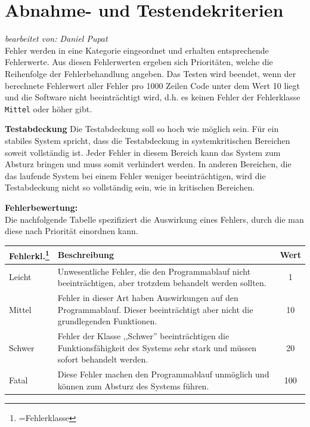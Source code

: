 \documentclass[fontsize=12pt,paper=a4,twoside]{scrartcl}
\begin{document}
\section{Abnahme- und Testendekriterien}\label{c07}
\textit{bearbeitet von: Daniel Pupat }\\

Fehler werden in eine Kategorie eingeordnet und erhalten entsprechende Fehlerwerte. Aus diesen Fehlerwerten ergeben sich Prioritäten, welche die Reihenfolge der Fehlerbehandlung angeben. Das Testen wird beendet, wenn der berechnete Fehlerwert aller Fehler pro 1000 Zeilen Code unter dem Wert 10 liegt und die Software nicht beeinträchtigt wird, d.h. es keinen Fehler der Fehlerklasse \texttt{Mittel} oder höher gibt.

\textbf{Testabdeckung}
Die Testabdeckung soll so hoch wie möglich sein. Für ein stabiles System spricht, dass die Testabdeckung in systemkritischen Bereichen soweit vollständig ist. Jeder Fehler in diesem Bereich kann das System zum Absturz bringen und muss somit verhindert werden. In anderen Bereichen, die das laufende System bei einem Fehler weniger beeinträchtigen, wird die Testabdeckung nicht so vollständig sein, wie in kritischen Bereichen.

\textbf{Fehlerbewertung:}\\
Die nachfolgende Tabelle spezifiziert die Auswirkung eines Fehlers, durch die man diese nach Priorität einordnen kann.\\

\begin{tabularx}{\textwidth}{|p{2cm}|p{11.53cm}|c|}
\hline
	\textbf{Fehlerkl.\footnote{=Fehlerklasse}} & \textbf{Beschreibung} & \textbf{Wert}\\
\hline
	Leicht & Unwesentliche Fehler, die den Programmablauf nicht beeinträchtigen, aber trotzdem behandelt werden sollten. & 1\\
\hline
	Mittel & Fehler in dieser Art haben Auswirkungen auf den Programmablauf. Dieser beeinträchtigt aber nicht die grundlegenden Funktionen. & 10\\
\hline
	Schwer & Fehler der Klasse ,,Schwer'' beeinträchtigen die Funktionsfähigkeit des Systems sehr stark und müssen sofort behandelt werden. & 20\\
\hline
	Fatal & Diese Fehler machen den Programmablauf unmöglich und können zum Absturz des Systems führen.  & 100\\
\hline
\end{tabularx}
\end{document}
